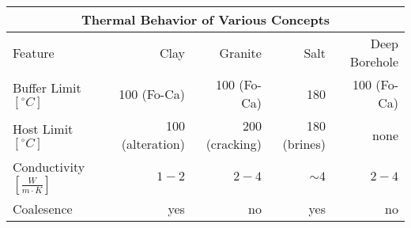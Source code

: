 %
\begin{table}[h!]
  \centering
  \footnotesize{
  \begin{tabular}{|l|r|r|r|r|}
    \multicolumn{5}{c}{\textbf{Thermal Behavior of Various Concepts}}\\
    \hline
    Feature & Clay & Granite & Salt & Deep Borehole \\ 
    \hline
    Buffer Limit $[^{\circ}C]$ & 100 (Fo-Ca) & 100 (Fo-Ca) & 180 & 100 (Fo-Ca) \\ 
    Host Limit $[^{\circ}C]$   & 100 (alteration)  & 200 (cracking) & 180 (brines) & none \\ 
    Conductivity $[\frac{W}{m{\cdot}K}]$ & $1-2$ & $2-4$ & $\sim4$  & $2-4$ \\ 
    Coalesence & yes & no & yes & no \\ 
    \hline
  \end{tabular}
  }
  \label{tab:heat_tab}
\end{table}

